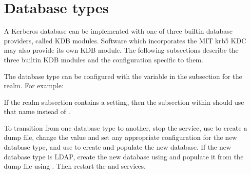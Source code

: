 \documentclass[letterpaper,10pt,english]{sphinxmanual}
\begin{document}
\sphinxstepscope


\chapter{Database types}
\label{\detokenize{admin/dbtypes:database-types}}\label{\detokenize{admin/dbtypes:dbtypes}}\label{\detokenize{admin/dbtypes::doc}}
\sphinxAtStartPar
A Kerberos database can be implemented with one of three built\sphinxhyphen{}in
database providers, called KDB modules.  Software which incorporates
the MIT krb5 KDC may also provide its own KDB module.  The following
subsections describe the three built\sphinxhyphen{}in KDB modules and the
configuration specific to them.

\sphinxAtStartPar
The database type can be configured with the  variable
in the {\hyperref[\detokenize{admin/conf_files/kdc_conf:dbmodules}]{}} subsection for the realm.  For example:

\begin{sphinxVerbatim}[commandchars=\\\{\}]
\PYG{p}{[}\PYG{p}{]}
      
          
\end{sphinxVerbatim}

\sphinxAtStartPar
If the  realm subsection contains a
 setting, then the subsection within
\sphinxcode{\sphinxupquote{{[}dbmodules{]}}} should use that name instead of .

\sphinxAtStartPar
To transition from one database type to another, stop the
{\hyperref[\detokenize{admin/admin_commands/kadmind:kadmind-8}]{}} service, use  to create a dump
file, change the  value and set any appropriate
configuration for the new database type, and use  to
create and populate the new database.  If the new database type is
LDAP, create the new database using  and populate it
from the dump file using .  Then restart the
{\hyperref[\detokenize{admin/admin_commands/krb5kdc:krb5kdc-8}]{}} and {\hyperref[\detokenize{admin/admin_commands/kadmind:kadmind-8}]{}} services.
\end{document}
